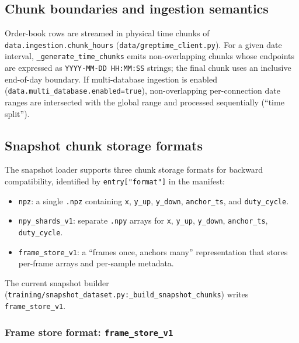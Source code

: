\documentclass[11pt]{article}
\begin{document}
\subsection{Chunk boundaries and ingestion semantics}

Order-book rows are streamed in physical time chunks of \texttt{data.ingestion.chunk\_hours} (\texttt{data/greptime\_client.py}). For a given date interval, \texttt{\_generate\_time\_chunks} emits non-overlapping chunks whose endpoints are expressed as \texttt{YYYY-MM-DD HH:MM:SS} strings; the final chunk uses an inclusive end-of-day boundary. If multi-database ingestion is enabled (\texttt{data.multi\_database.enabled=true}), non-overlapping per-connection date ranges are intersected with the global range and processed sequentially (``time split'').

\subsection{Snapshot chunk storage formats}

The snapshot loader supports three chunk storage formats for backward compatibility, identified by \texttt{entry["format"]} in the manifest:
\begin{itemize}
  \item \texttt{npz}: a single \texttt{.npz} containing \texttt{x}, \texttt{y\_up}, \texttt{y\_down}, \texttt{anchor\_ts}, and \texttt{duty\_cycle}.
  \item \texttt{npy\_shards\_v1}: separate \texttt{.npy} arrays for \texttt{x}, \texttt{y\_up}, \texttt{y\_down}, \texttt{anchor\_ts}, \texttt{duty\_cycle}.
  \item \texttt{frame\_store\_v1}: a ``frames once, anchors many'' representation that stores per-frame arrays and per-sample metadata.
\end{itemize}

The current snapshot builder (\texttt{training/snapshot\_dataset.py:\_build\_snapshot\_chunks}) writes \texttt{frame\_store\_v1}.

\subsubsection{Frame store format: \texttt{frame\_store\_v1}}
\end{document}
